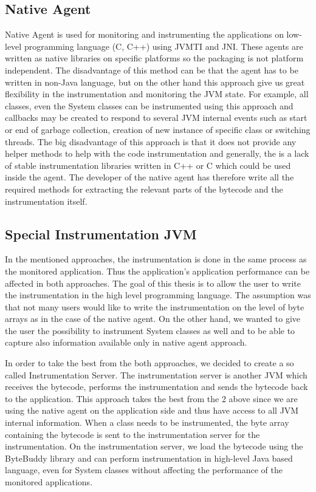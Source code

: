 \subsection{Native Agent}
Native Agent is used for monitoring and instrumenting the applications on low-level programming language (C, C++) using JVMTI and JNI. These agents are written as native libraries on specific platforms so the packaging is not platform independent. The disadvantage of this method can be that the agent has to be written in non-Java language, but on the other hand this approach give us great flexibility in the instrumentation and monitoring the JVM state. For example, all classes, even the System classes can be instrumented using this approach and callbacks may be created to respond to several JVM internal events such as start or end of garbage collection, creation of new instance of specific class or switching threads. The big disadvantage of this approach is that it does not provide any helper methods to help with the code instrumentation and generally, the is a lack of stable instrumentation libraries written in C++ or C which could be used inside the agent. The developer of the native agent has therefore write all the required methods for extracting the relevant parts of the bytecode and the instrumentation itself.


\subsection{Special Instrumentation JVM}
In the mentioned approaches, the instrumentation is done in the same process as the monitored application. Thus the application's application performance can be affected in both approaches. The goal of this thesis is to allow the user to write the instrumentation in the high level programming language. The assumption was that not many users would like to write the instrumentation on the level of byte arrays as in the case of the native agent. On the other hand, we wanted to give the user the possibility to instrument System classes as well and to be able to capture also information available only in native agent approach.

In order to take the best from the both approaches, we decided to create a so called Instrumentation Server. The instrumentation server is another JVM which receives the bytecode, performs the instrumentation and sends the bytecode back to the application.
This approach takes the best from the 2 above since we are using the native agent on the application side and thus have access to all JVM internal information. When a class needs to be instrumented,  the byte array containing the bytecode is sent to the instrumentation server for the instrumentation. On the instrumentation server, we load the bytecode using the ByteBuddy library and can perform instrumentation in high-level Java based language, even for System classes without affecting the performance of the monitored applications.

